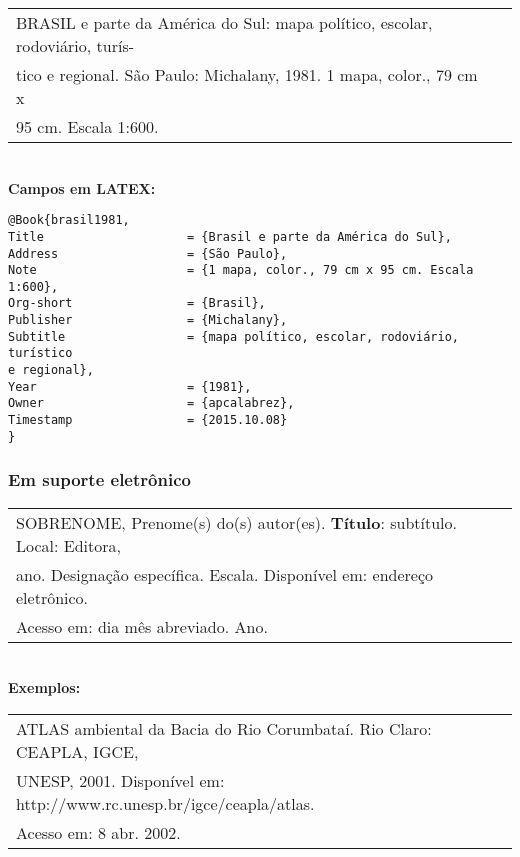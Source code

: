 \begin{tabular}{|l|c|} \hline
	BRASIL e parte da América do Sul: mapa político, escolar, rodoviário,
	turís-\\ 
	tico e regional. São Paulo: Michalany, 1981. 1 mapa, color., 79 cm x\\
	95 cm. Escala 1:600. 
	\\\hline
\end{tabular} \\

\textbf{Campos em LATEX:} 

\begin{verbatim}
@Book{brasil1981,
Title                    = {Brasil e parte da América do Sul},
Address                  = {São Paulo},
Note                     = {1 mapa, color., 79 cm x 95 cm. Escala 1:600},
Org-short                = {Brasil},
Publisher                = {Michalany},
Subtitle                 = {mapa político, escolar, rodoviário, turístico 
e regional},
Year                     = {1981},
Owner                    = {apcalabrez},
Timestamp                = {2015.10.08}
}
\end{verbatim}

\subsubsection{Em suporte eletrônico}

\begin{tabular}{|l|c|} \hline
	SOBRENOME, Prenome(s) do(s) autor(es). \textbf{Título}: subtítulo. Local: Editora,\\
	ano. Designação específica. Escala. Disponível em: endereço eletrônico. \\
	Acesso em: dia mês abreviado. Ano. 
	\\\hline
\end{tabular} \\

\textbf{Exemplos:} \\

\begin{tabular}{|l|c|} \hline
	ATLAS ambiental da Bacia do Rio Corumbataí. Rio Claro: CEAPLA, IGCE,\\
	UNESP, 2001. Disponível em: http://www.rc.unesp.br/igce/ceapla/atlas.\\
	Acesso em: 8 abr. 2002. 
	\\\hline
\end{tabular} \\

